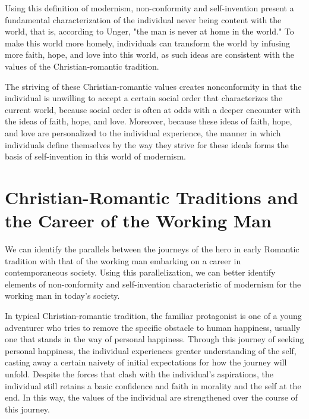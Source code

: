 \documentclass[12pt,letterpaper]{article}
\newif\ifdraft
\begin{document}
Using this definition of modernism, non-conformity and self-invention present a fundamental characterization of the individual never being content with the world, that is, according to Unger, "the man is never at home in the world."  To make this world more homely, individuals can transform the world by infusing more faith, hope, and love into this world, as such ideas are consistent with the values of the Christian-romantic tradition.  


The striving of these Christian-romantic values creates nonconformity in that the individual is unwilling to accept a certain social order that characterizes the current world, because social order is often at odds with a deeper encounter with the ideas of faith, hope, and love.  Moreover, because these ideas of faith, hope, and love are personalized to the individual experience, the manner in which individuals define themselves by the way they strive for these ideals forms the basis of self-invention in this world of modernism.  

\ifdraft

When understanding the role of Christian element in the world, we come to an formalization of our transformation over in the timeline of a career, where we make the world that we live in more ``homely" so that we can better appreciate.  
\fi

\section{Christian-Romantic Traditions and the Career of the Working Man}
We can identify the parallels between the journeys of the hero in early Romantic tradition with that of the working man embarking on a career in contemporaneous society.  Using this parallelization, we can better identify elements of non-conformity and self-invention characteristic of modernism for the working man in today's society.

In typical Christian-romantic tradition, the familiar protagonist is one of a young adventurer who tries to remove the specific obstacle to human happiness, usually one that stands in the way of personal happiness.  Through this journey of seeking personal happiness, the individual experiences greater understanding of the self, casting away a certain naivety of initial expectations for how the journey will unfold.  Despite the forces that clash with the individual's aspirations, the individual still retains a basic confidence and faith in morality and the self at the end.  In this way, the values of the individual are strengthened over the course of this journey.
\end{document}
